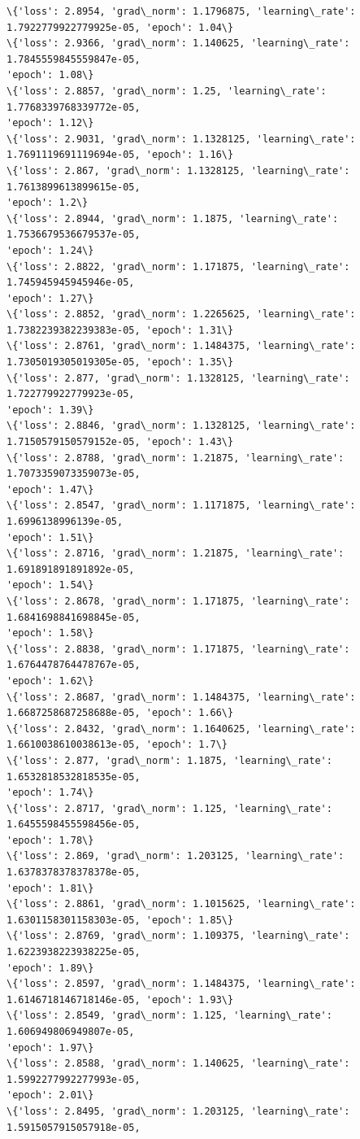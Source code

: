 \documentclass[11pt]{article}
\begin{document}
\begin{Verbatim}[commandchars=\\\{\}]
\{'loss': 2.8954, 'grad\_norm': 1.1796875, 'learning\_rate':
1.7922779922779925e-05, 'epoch': 1.04\}
\{'loss': 2.9366, 'grad\_norm': 1.140625, 'learning\_rate': 1.7845559845559847e-05,
'epoch': 1.08\}
\{'loss': 2.8857, 'grad\_norm': 1.25, 'learning\_rate': 1.7768339768339772e-05,
'epoch': 1.12\}
\{'loss': 2.9031, 'grad\_norm': 1.1328125, 'learning\_rate':
1.7691119691119694e-05, 'epoch': 1.16\}
\{'loss': 2.867, 'grad\_norm': 1.1328125, 'learning\_rate': 1.7613899613899615e-05,
'epoch': 1.2\}
\{'loss': 2.8944, 'grad\_norm': 1.1875, 'learning\_rate': 1.7536679536679537e-05,
'epoch': 1.24\}
\{'loss': 2.8822, 'grad\_norm': 1.171875, 'learning\_rate': 1.745945945945946e-05,
'epoch': 1.27\}
\{'loss': 2.8852, 'grad\_norm': 1.2265625, 'learning\_rate':
1.7382239382239383e-05, 'epoch': 1.31\}
\{'loss': 2.8761, 'grad\_norm': 1.1484375, 'learning\_rate':
1.7305019305019305e-05, 'epoch': 1.35\}
\{'loss': 2.877, 'grad\_norm': 1.1328125, 'learning\_rate': 1.722779922779923e-05,
'epoch': 1.39\}
\{'loss': 2.8846, 'grad\_norm': 1.1328125, 'learning\_rate':
1.7150579150579152e-05, 'epoch': 1.43\}
\{'loss': 2.8788, 'grad\_norm': 1.21875, 'learning\_rate': 1.7073359073359073e-05,
'epoch': 1.47\}
\{'loss': 2.8547, 'grad\_norm': 1.1171875, 'learning\_rate': 1.6996138996139e-05,
'epoch': 1.51\}
\{'loss': 2.8716, 'grad\_norm': 1.21875, 'learning\_rate': 1.691891891891892e-05,
'epoch': 1.54\}
\{'loss': 2.8678, 'grad\_norm': 1.171875, 'learning\_rate': 1.6841698841698845e-05,
'epoch': 1.58\}
\{'loss': 2.8838, 'grad\_norm': 1.171875, 'learning\_rate': 1.6764478764478767e-05,
'epoch': 1.62\}
\{'loss': 2.8687, 'grad\_norm': 1.1484375, 'learning\_rate':
1.6687258687258688e-05, 'epoch': 1.66\}
\{'loss': 2.8432, 'grad\_norm': 1.1640625, 'learning\_rate':
1.6610038610038613e-05, 'epoch': 1.7\}
\{'loss': 2.877, 'grad\_norm': 1.1875, 'learning\_rate': 1.6532818532818535e-05,
'epoch': 1.74\}
\{'loss': 2.8717, 'grad\_norm': 1.125, 'learning\_rate': 1.6455598455598456e-05,
'epoch': 1.78\}
\{'loss': 2.869, 'grad\_norm': 1.203125, 'learning\_rate': 1.6378378378378378e-05,
'epoch': 1.81\}
\{'loss': 2.8861, 'grad\_norm': 1.1015625, 'learning\_rate':
1.6301158301158303e-05, 'epoch': 1.85\}
\{'loss': 2.8769, 'grad\_norm': 1.109375, 'learning\_rate': 1.6223938223938225e-05,
'epoch': 1.89\}
\{'loss': 2.8597, 'grad\_norm': 1.1484375, 'learning\_rate':
1.6146718146718146e-05, 'epoch': 1.93\}
\{'loss': 2.8549, 'grad\_norm': 1.125, 'learning\_rate': 1.606949806949807e-05,
'epoch': 1.97\}
\{'loss': 2.8588, 'grad\_norm': 1.140625, 'learning\_rate': 1.5992277992277993e-05,
'epoch': 2.01\}
\{'loss': 2.8495, 'grad\_norm': 1.203125, 'learning\_rate': 1.5915057915057918e-05,

\end{Verbatim}
\end{document}
